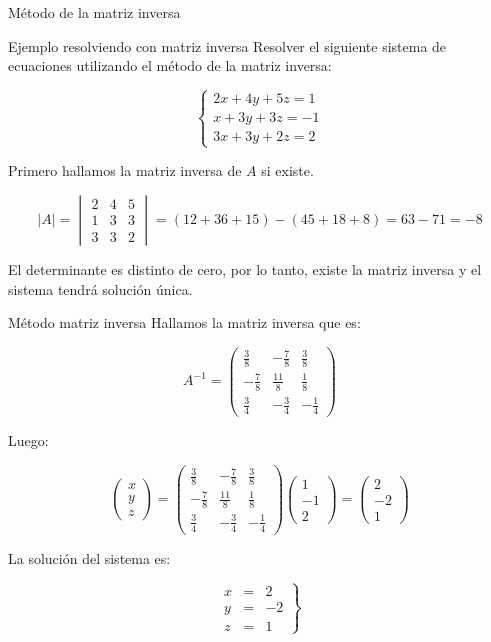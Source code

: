 \documentclass[9pt]{beamer}
\newcommand{\matriztres}[9]{\begin{pmatrix} #1 & #2 & #3 \\ #4 & #5 & #6 \\ #7 & #8 & #9 \end{pmatrix}}
\newcommand{\determinantetres}[9]{\begin{vmatrix} #1 & #2 & #3 \\ #4 & #5 & #6 \\ #7 & #8 & #9 \end{vmatrix}}
\begin{document}
\begin{frame}{Método de la matriz inversa}
\begin{exampleblock}{Ejemplo resolviendo con matriz inversa}
Resolver el siguiente sistema de ecuaciones utilizando el método de la matriz inversa:

\[\begin{cases}
2x+4y+5z=1 \\
x+3y+3z=-1  \\
3x+3y+2z=2
\end{cases}
 \]
\end{exampleblock}
\pause

Primero hallamos la matriz inversa de $A$ si existe.

\[ |A|= \determinantetres{2}{4}{5}{1}{3}{3}{3}{3}{2} = (12+36+15)-(45+18+8)=63-71=-8 \]
\pause

El determinante es distinto de cero, por lo tanto, existe la matriz inversa y el sistema tendrá solución única.
\end{frame}

\begin{frame}{Método matriz inversa}
Hallamos la matriz inversa que es:


\[ A^{-1}=\matriztres{\frac{3}{8}}{-\frac{7}{8}}{\frac{3}{8}}{-\frac{7}{8}}{\frac{11}{8}}{\frac{1}{8}}{\frac{3}{4}}{-\frac{3}{4}}{-\frac{1}{4}} \]
\pause

Luego:

\[ \begin{pmatrix}
x \\ y \\ z
\end{pmatrix} = 
\matriztres{\frac{3}{8}}{-\frac{7}{8}}{\frac{3}{8}}{-\frac{7}{8}}{\frac{11}{8}}{\frac{1}{8}}{\frac{3}{4}}{-\frac{3}{4}}{-\frac{1}{4}} 
\begin{pmatrix}
1 \\ -1 \\ 2 
\end{pmatrix}= 
\begin{pmatrix}
2 \\ -2 \\ 1
\end{pmatrix} \]
\pause


La solución del sistema es:

\[ \left. \begin{array}{rrr} x&=& 2  \\ y&=& -2 \\ z&=&1 
\end{array} \right\rbrace \]

\end{frame}
\end{document}
